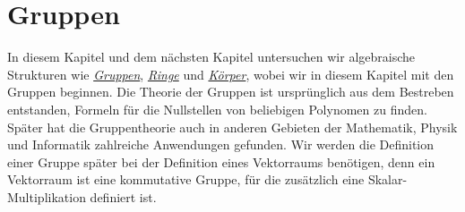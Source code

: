 \chapter{Gruppen}
In diesem Kapitel und dem n\"{a}chsten Kapitel untersuchen wir algebraische Strukturen wie
\href{http://de.wikipedia.org/wiki/Gruppe_(Mathematik)}{\emph{Gruppen}}, 
\href{http://de.wikipedia.org/wiki/Ring_(Algebra)}{\emph{Ringe}}
 und 
\href{http://en.wikipedia.org/wiki/Field_(mathematics)}{\emph{K\"{o}rper}}, 
wobei wir in diesem Kapitel mit den Gruppen beginnen.
Die Theorie der Gruppen ist urspr\"{u}nglich aus dem Bestreben entstanden, Formeln f\"{u}r die
Nullstellen von beliebigen Polynomen zu finden.  Sp\"{a}ter hat die Gruppentheorie auch in
anderen Gebieten der Mathematik, Physik und Informatik zahlreiche Anwendungen gefunden.
Wir werden die Definition einer Gruppe sp\"{a}ter bei der Definition eines Vektorraums ben\"{o}tigen, 
denn ein Vektorraum ist eine kommutative Gruppe, f\"{u}r die zus\"{a}tzlich eine Skalar-Multiplikation
definiert ist.

